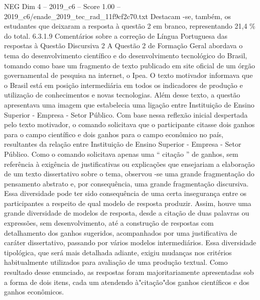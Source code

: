 \begin{textsample}{NEG Dim 4 – 2019\_c6 – Score 1.00 – 2019\_c6/enade\_2019\_tec\_rad\_11f9cf2c70.txt}
Destacam -se, também, os estudantes que deixaram a resposta à questão 2 em branco, representando 21,4 \% do total. 6.3.1.9 Comentários sobre a correção de Língua Portuguesa das respostas à Questão Discursiva 2 A Questão 2 de Formação Geral abordava o tema do desenvolvimento científico e do desenvolvimento tecnológico do Brasil, tomando como base um fragmento de texto publicado em site oficial de um órgão governamental de pesquisa na internet, o Ipea.
O texto motivador informava que o Brasil está em posição intermediária em todos os indicadores de produção e utilização de conhecimentos e novas tecnologias.
Além desse texto, a questão apresentava uma imagem que estabelecia uma ligação entre Instituição de Ensino Superior - Empresa - Setor Público.
Com base nessa reflexão inicial despertada pelo texto motivador, o comando solicitava que o participante citasse dois ganhos para o campo científico e dois ganhos para o campo econômico no país, resultantes da relação entre Instituição de Ensino Superior - Empresa - Setor Público.
Como o comando solicitava apenas uma “ citação ” de ganhos, sem referência à exigência de justificativas ou explicações que ensejariam a elaboração de um texto dissertativo sobre o tema, observou -se uma grande fragmentação do pensamento abstrato e, por consequência, uma grande fragmentação discursiva.
Essa diversidade pode ter sido consequência de uma certa insegurança entre os participantes a respeito de qual modelo de resposta produzir.
Assim, houve uma grande diversidade de modelos de resposta, desde a citação de duas palavras ou expressões, sem desenvolvimento, até a construção de respostas com detalhamento dos ganhos sugeridos, acompanhados por uma justificativa de caráter dissertativo, passando por vários modelos intermediários.
Essa diversidade tipológica, que será mais detalhada adiante, exigiu mudanças nos critérios habitualmente utilizados para avaliação de uma produção textual.
Como resultado desse enunciado, as respostas foram majoritariamente apresentadas sob a forma de dois itens, cada um atendendo à"citação"dos ganhos científicos e dos ganhos econômicos.

\end{textsample}
